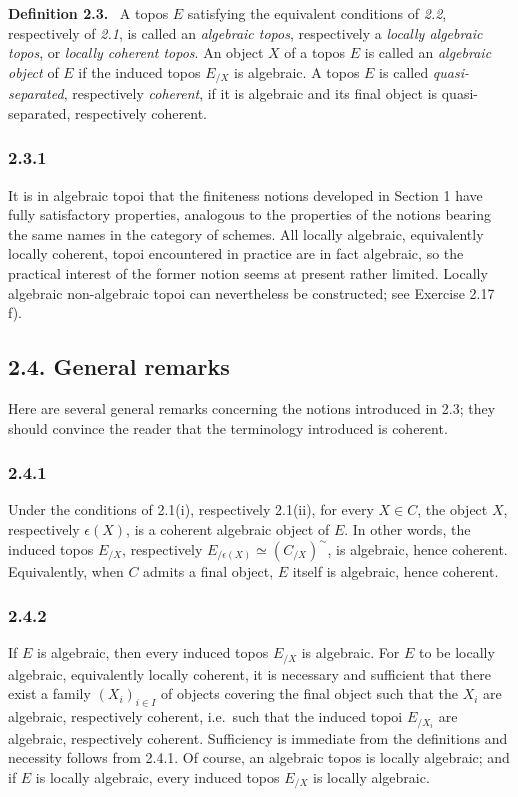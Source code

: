 \documentclass[11pt]{article}
\newcommand{\ie}{i.e.\ }
\newenvironment{statement}[1]{\par\medskip\noindent\textbf{#1.}\ }{\par\medskip}
\begin{document}
\begin{statement}{Definition 2.3}
A topos \(E\) satisfying the equivalent conditions of \emph{2.2}, respectively of \emph{2.1}, is called an \emph{algebraic topos}, respectively a \emph{locally algebraic topos}, or \emph{locally coherent topos}. An object \(X\) of a topos \(E\) is called an \emph{algebraic object} of \(E\) if the induced topos \(E_{/X}\) is algebraic. A topos \(E\) is called \emph{quasi-separated}, respectively \emph{coherent}, if it is algebraic and its final object is quasi-separated, respectively coherent.
\end{statement}

\subsubsection*{2.3.1}
It is in algebraic topoi that the finiteness notions developed in Section 1 have fully satisfactory properties, analogous to the properties of the notions bearing the same names in the category of schemes. All locally algebraic, equivalently locally coherent, topoi encountered in practice are in fact algebraic, so the practical interest of the former notion seems at present rather limited. Locally algebraic non-algebraic topoi can nevertheless be constructed; see Exercise 2.17 f).

\subsection*{2.4. General remarks}
Here are several general remarks concerning the notions introduced in 2.3; they should convince the reader that the terminology introduced is coherent.

\subsubsection*{2.4.1}
Under the conditions of 2.1(i), respectively 2.1(ii), for every \(X\in C\), the object \(X\), respectively \(\epsilon(X)\), is a coherent algebraic object of \(E\). In other words, the induced topos \(E_{/X}\), respectively \(E_{/\epsilon(X)}\simeq (C_{/X})^\sim\), is algebraic, hence coherent. Equivalently, when \(C\) admits a final object, \(E\) itself is algebraic, hence coherent.

\subsubsection*{2.4.2}
If \(E\) is algebraic, then every induced topos \(E_{/X}\) is algebraic. For \(E\) to be locally algebraic, equivalently locally coherent, it is necessary and sufficient that there exist a family \((X_i)_{i\in I}\) of objects covering the final object such that the \(X_i\) are algebraic, respectively coherent, \ie such that the induced topoi \(E_{/X_i}\) are algebraic, respectively coherent. Sufficiency is immediate from the definitions and necessity follows from 2.4.1. Of course, an algebraic topos is locally algebraic; and if \(E\) is locally algebraic, every induced topos \(E_{/X}\) is locally algebraic.
\end{document}
